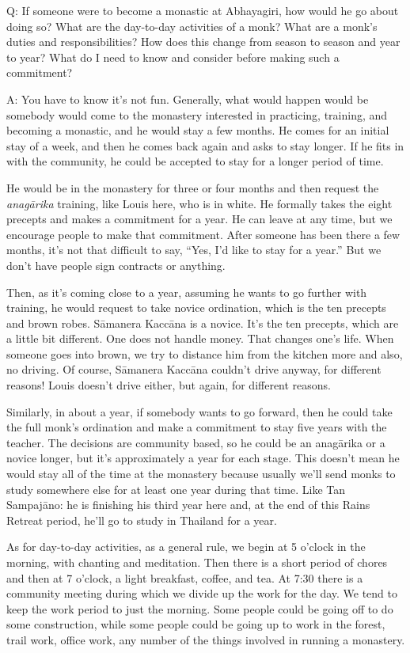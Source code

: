 \qaspace
Q: If someone were to become a monastic at Abhayagiri, how would he go
about doing so? What are the day-to-day activities of a monk? What are a
monk’s duties and responsibilities? How does this change from season to
season and year to year? What do I need to know and consider before
making such a commitment?

\qaspace
A: You have to know it’s not fun. Generally, what would happen would be
somebody would come to the monastery interested in practicing, training,
and becoming a monastic, and he would stay a few months. He comes for an
initial stay of a week, and then he comes back again and asks to stay
longer. If he fits in with the community, he could be accepted to stay
for a longer period of time.

He would be in the monastery for three or four months and then request
the \emph{anagārika} training, like Louis here, who is in white. He
formally takes the eight precepts and makes a commitment for a year. He
can leave at any time, but we encourage people to make that commitment.
After someone has been there a few months, it’s not that difficult to
say, “Yes, I’d like to stay for a year.” But we don’t have people sign
contracts or anything.

Then, as it’s coming close to a year, assuming he wants to go further
with training, he would request to take novice ordination, which is the
ten precepts and brown robes. Sāmanera Kaccāna is a novice. It’s the ten
precepts, which are a little bit different. One does not handle money.
That changes one’s life. When someone goes into brown, we try to
distance him from the kitchen more and also, no driving. Of course,
Sāmanera Kaccāna couldn’t drive anyway, for different reasons! Louis
doesn’t drive either, but again, for different reasons.

Similarly, in about a year, if somebody wants to go forward, then he
could take the full monk’s ordination and make a commitment to stay five
years with the teacher. The decisions are community based, so he could
be an anagārika or a novice longer, but it’s approximately a year for
each stage. This doesn’t mean he would stay all of the time at the
monastery because usually we’ll send monks to study somewhere else for
at least one year during that time. Like Tan Sampajāno: he is finishing
his third year here and, at the end of this Rains Retreat period, he’ll
go to study in Thailand for a year.

As for day-to-day activities, as a general rule, we begin at 5 o’clock
in the morning, with chanting and meditation. Then there is a short
period of chores and then at 7 o’clock, a light breakfast, coffee, and
tea. At 7:30 there is a community meeting during which we divide up the
work for the day. We tend to keep the work period to just the morning.
Some people could be going off to do some construction, while some
people could be going up to work in the forest, trail work, office work,
any number of the things involved in running a monastery.

